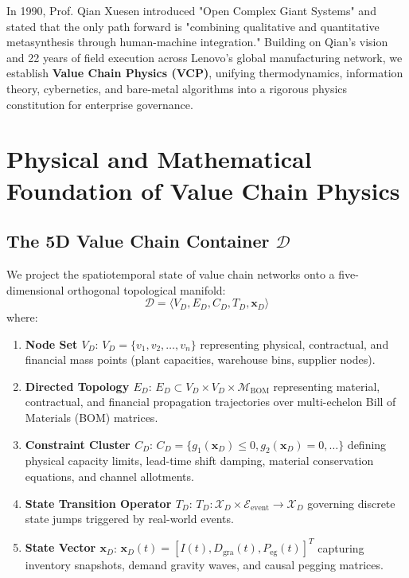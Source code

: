 \documentclass[11pt,a4paper]{article}
\begin{document}
In 1990, Prof. Qian Xuesen introduced "Open Complex Giant Systems" and stated that the only path forward is "combining qualitative and quantitative metasynthesis through human-machine integration." Building on Qian's vision and 22 years of field execution across Lenovo's global manufacturing network, we establish \textbf{Value Chain Physics (VCP)}, unifying thermodynamics, information theory, cybernetics, and bare-metal algorithms into a rigorous physics constitution for enterprise governance.

\section{Physical and Mathematical Foundation of Value Chain Physics}

\subsection{The 5D Value Chain Container $\mathcal{D}$}

We project the spatiotemporal state of value chain networks onto a five-dimensional orthogonal topological manifold:
\begin{equation}
    \mathcal{D} = \langle V_D, E_D, C_D, T_D, \mathbf{x}_D \rangle
\end{equation}
where:
\begin{enumerate}
    \item \textbf{Node Set $V_D$}: $V_D = \{v_1, v_2, \dots, v_n\}$ representing physical, contractual, and financial mass points (plant capacities, warehouse bins, supplier nodes).
    \item \textbf{Directed Topology $E_D$}: $E_D \subset V_D \times V_D \times \mathcal{M}_{\mathrm{BOM}}$ representing material, contractual, and financial propagation trajectories over multi-echelon Bill of Materials (BOM) matrices.
    \item \textbf{Constraint Cluster $C_D$}: $C_D = \{g_1(\mathbf{x}_D) \le 0, g_2(\mathbf{x}_D) = 0, \dots\}$ defining physical capacity limits, lead-time shift damping, material conservation equations, and channel allotments.
    \item \textbf{State Transition Operator $T_D$}: $T_D: \mathcal{X}_D \times \mathcal{E}_{\mathrm{event}} \longrightarrow \mathcal{X}_D$ governing discrete state jumps triggered by real-world events.
    \item \textbf{State Vector $\mathbf{x}_D$}: $\mathbf{x}_D(t) = [I(t), D_{\mathrm{gra}}(t), P_{\mathrm{eg}}(t)]^T$ capturing inventory snapshots, demand gravity waves, and causal pegging matrices.
\end{enumerate}
\end{document}
